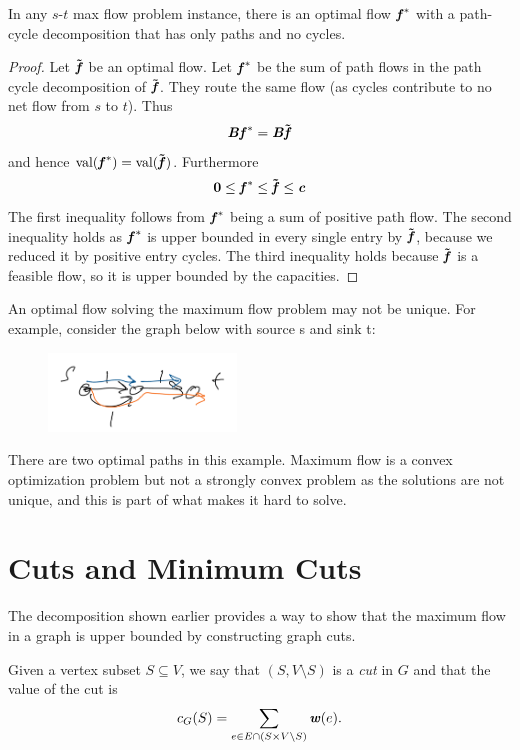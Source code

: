 \begin{lemma}
In any $s$-$t$ max flow problem instance, there is an optimal flow \(\boldsymbol{\mathit{f}}^*\) with a path-cycle decomposition that has only paths and no cycles.
\end{lemma}

\begin{proof} Let \(\boldsymbol{\tilde{\mathit{f}}}\) be an optimal flow. Let \(\boldsymbol{\mathit{f}}^*\) be the
  sum of path flows in the path cycle decomposition of
  \(\boldsymbol{\tilde{\mathit{f}}}\). They route the same flow (as cycles contribute to no net
  flow from $s$ to $t$). Thus
 \begin{align*}
  \boldsymbol{\mathit{B}}\boldsymbol{\mathit{f}}^* = \boldsymbol{\mathit{B}}\boldsymbol{\tilde{\mathit{f}}}
 \end{align*}
 and hence $\operatorname*{val}(\boldsymbol{\mathit{f}}^*) = \operatorname*{val}(\boldsymbol{\tilde{\mathit{f}}})$.
 Furthermore
\begin{equation*}
  \boldsymbol{0} \leq \boldsymbol{\mathit{f}}^* \leq \boldsymbol{\tilde{\mathit{f}}} \leq \boldsymbol{\mathit{c}}
\end{equation*}
The first inequality follows from  \(\boldsymbol{\mathit{f}}^*\) being a sum of positive
path flow.
The second inequality holds as $\boldsymbol{\mathit{f}}^*$ is upper bounded in every single entry by \(\boldsymbol{\tilde{\mathit{f}}}\), because we reduced
it by positive entry cycles.
The third inequality holds because
$\boldsymbol{\tilde{\mathit{f}}}$ is a feasible flow, so it is upper bounded by the capacities.
\end{proof}
An optimal flow solving the maximum flow problem may not be unique.
For example, consider the graph below with source s and sink t:\\
\begin{figure}[H]
 \centering
  \includegraphics[width=50mm,scale=0.1]{fig/fig1_lec10.PNG}
  \label{fig:ex1}
\end{figure}
There are two optimal paths in this example.
Maximum flow is a convex optimization problem but not a strongly
convex problem as the solutions are not unique, and this is part of
what makes it hard to solve.

\section{Cuts and Minimum Cuts}

The decomposition shown earlier provides a way to show that the
maximum flow in a graph is upper bounded by constructing graph
cuts.

Given a vertex subset $S \subseteq V$, we say that $(S, V\setminus S)$
is a \emph{cut} in $G$ and that the value of the cut is
\[
  c_G(S) = \sum_{e \in E \cap (S \times V\setminus S) } \boldsymbol{\mathit{w}}(e)
  .
\]

